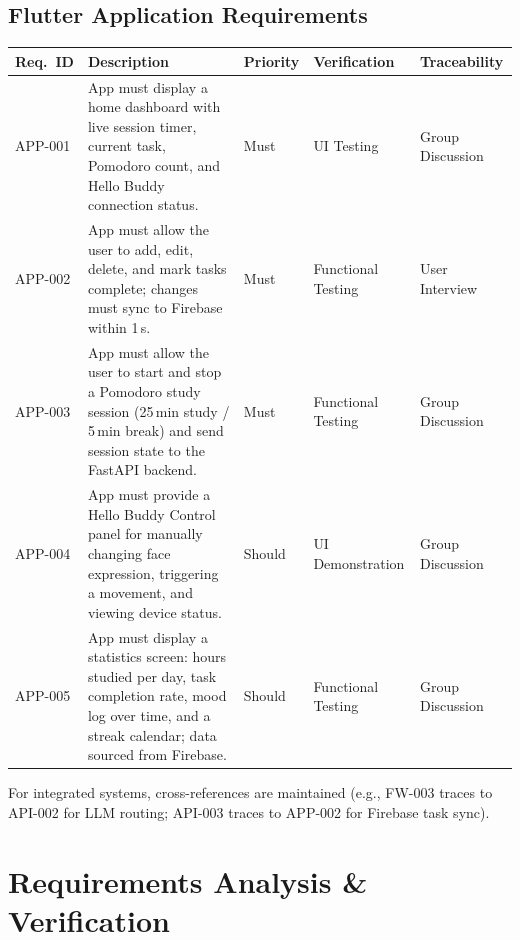 \documentclass[12pt,a4paper]{article}
\begin{document}
\subsection*{Flutter Application Requirements}

\begin{center}
\scriptsize
\begin{tabular}{|L{0.07\textwidth}|L{0.35\textwidth}|L{0.10\textwidth}|L{0.18\textwidth}|L{0.18\textwidth}|}
\hline
\textbf{Req.~ID} & \textbf{Description} & \textbf{Priority} &
\textbf{Verification} & \textbf{Traceability} \\ \hline
APP-001 &
App must display a home dashboard with live session timer,
current task, Pomodoro count, and Hello Buddy connection
status. &
Must &
UI Testing &
Group Discussion \\ \hline
APP-002 &
App must allow the user to add, edit, delete, and mark tasks
complete; changes must sync to Firebase within 1\,s. &
Must &
Functional Testing &
User Interview \\ \hline
APP-003 &
App must allow the user to start and stop a Pomodoro study
session (25\,min study / 5\,min break) and send session state
to the FastAPI backend. &
Must &
Functional Testing &
Group Discussion \\ \hline
APP-004 &
App must provide a Hello Buddy Control panel for manually
changing face expression, triggering a movement, and viewing
device status. &
Should &
UI Demonstration &
Group Discussion \\ \hline
APP-005 &
App must display a statistics screen: hours studied per day,
task completion rate, mood log over time, and a streak
calendar; data sourced from Firebase. &
Should &
Functional Testing &
Group Discussion \\ \hline
\end{tabular}
\end{center}

\vspace{0.3cm}

For integrated systems, cross-references are maintained (e.g., FW-003 traces to
API-002 for LLM routing; API-003 traces to APP-002 for Firebase task sync).

\newpage
\section*{Requirements Analysis \& Verification}
\end{document}
